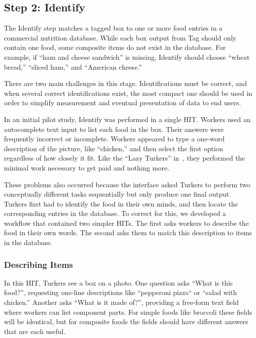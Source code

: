 \subsection{Step 2: Identify}

The Identify step matches a tagged box to one or more food entries in
a commercial nutrition database. While each box output from Tag should
only contain one food, some composite items do not exist in the
database. For example, if ``ham and cheese sandwich'' is missing,
Identify should choose ``wheat bread,'' ``sliced ham,'' and ``American
cheese.''

There are two main challenges in this stage. Identifications must be
correct, and when several correct identifications exist, the most
compact one should be used in order to simplify measurement and eventual
presentation of data to end users.

In an initial pilot study, Identify was performed in a single
HIT. Workers used an autocomplete text input to list each food in the
box.  Their answers were frequently incorrect or incomplete. Workers
appeared to type a one-word description of the picture, like
``chicken,'' and then select the first option regardless of how
closely it fit. Like the ``Lazy Turkers''
in~\cite{bernstein2010soylent}, they performed the minimal work
necessary to get paid and nothing more.

These problems also occurred because the interface asked Turkers to
perform two conceptually different tasks sequentially but only produce
one final output. Turkers first had to identify the food in their own
minds, and then locate the corresponding entries in the database. To
correct for this, we developed a workflow that contained two simpler
HITs. The first asks workers to describe the food in their own
words. The second asks them to match this description to items in the
database.

\subsubsection{Describing Items} In this HIT, Turkers see a box on a photo. One question asks ``What is this food?'', requesting one-line descriptions like ``pepperoni pizza`` or ``salad with chicken.'' Another asks ``What is it made of?'', providing a free-form text field where workers can list component parts. For simple foods like broccoli these fields will be identical, but for composite foods the fields should have different answers that are each useful.

